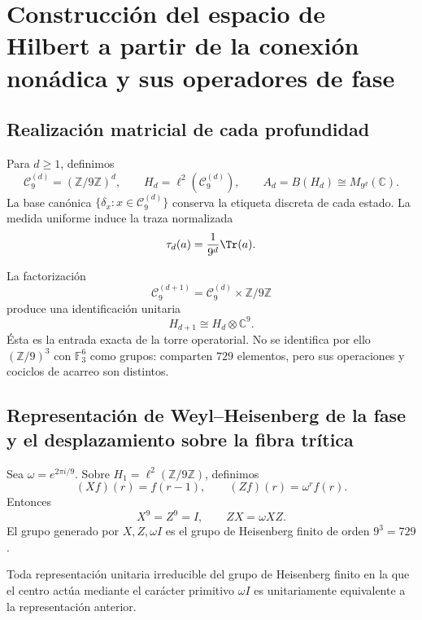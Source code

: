 \label{chap:83-21}



\section{Construcción del espacio de Hilbert a partir de la conexión nonádica y sus operadores de fase}

\subsection{Realización matricial de cada profundidad}

Para \(d\ge1\), definimos
\[
  \mathcal C_9^{(d)}=(\mathbb Z/9\mathbb Z)^d,
  \qquad
  H_d=\ell^2(\mathcal C_9^{(d)}),
  \qquad
  A_d=B(H_d)\cong M_{9^d}(\mathbb C).
\]
La base canónica \(\{\delta_x:x\in\mathcal C_9^{(d)}\}\) conserva la
etiqueta discreta de cada estado. La medida uniforme induce la traza
normalizada
\[
  \tau_d(a)=\frac{1}{9^d}\Tr(a).
\]

La factorización
\[
  \mathcal C_9^{(d+1)}
  =
  \mathcal C_9^{(d)}\times\mathbb Z/9\mathbb Z
\]
produce una identificación unitaria
\[
  H_{d+1}\cong H_d\otimes\mathbb C^9.
\]
Ésta es la entrada exacta de la torre operatorial. No se identifica por ello
\((\mathbb Z/9)^3\) con \(\mathbb F_3^6\) como grupos: comparten \(729\)
elementos, pero sus operaciones y cociclos de acarreo son distintos.

\subsection{Representación de Weyl–Heisenberg de la fase y el desplazamiento sobre la fibra trítica}

Sea \(\omega=e^{2\pi i/9}\). Sobre
\(H_1=\ell^2(\mathbb Z/9\mathbb Z)\), definimos
\[
  (Xf)(r)=f(r-1),
  \qquad
  (Zf)(r)=\omega^r f(r).
\]
Entonces
\[
  X^9=Z^9=I,
  \qquad
  ZX=\omega XZ.
\]
El grupo generado por \(X,Z,\omega I\) es el grupo de Heisenberg finito de
orden \(9^3=729\).

\begin{theorem}
Toda representación unitaria irreducible del grupo de Heisenberg finito en
la que el centro actúa mediante el carácter primitivo
\(\omega I\) es unitariamente equivalente a la representación anterior.
\end{theorem}


